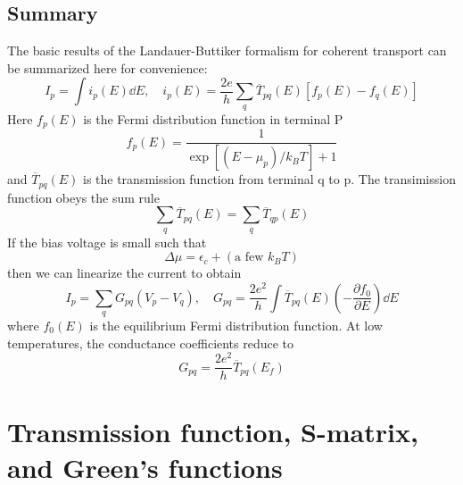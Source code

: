 \documentclass[11pt,a4paper]{book}
\theoremstyle{plain}
\theoremstyle{definition}
\theoremstyle{remark}
\begin{document}
\section{Summary}
The basic results of the Landauer-Buttiker formalism for coherent transport can be summarized here for convenience:
\begin{equation}
    I_p = \int i_p(E) \dd E, \quad i_p(E) = \frac{2 e}{h} \sum_q \overline{T}_{pq}(E) \left[ f_p(E) - f_q(E) \right]
\end{equation}
Here $f_p(E)$ is the Fermi distribution function in terminal P
\begin{equation}
    f_p(E) = \frac{1}{\exp \left[(E - \mu_p)/k_B T \right] + 1}
\end{equation}
and $\overline{T}_{pq}(E)$ is the transmission function from terminal q to p. The transimission function obeys the sum rule
\begin{equation}
    \sum_q \overline{T}_{pq}(E) = \sum_q \overline{T}_{qp}(E)
\end{equation}
If the bias voltage is small such that
\begin{equation}
    \Delta \mu = \epsilon_c + (\mbox{a few } k_B T)
\end{equation}
then we can linearize the current to obtain
\begin{equation}
    I_p = \sum_q G_{pq} (V_p - V_q), \quad G_{pq} = \frac{2 e^2}{h} \int \overline{T}_{pq}(E) \left( -\frac{\partial f_0}{\partial E} \right) \dd E
\end{equation}
where $f_0(E)$ is the equilibrium Fermi distribution function. At low temperatures, the conductance coefficients reduce to
\begin{equation}
    G_{pq} = \frac{2 e^2}{h} \overline{T}_{pq}(E_f)
\end{equation}

\chapter{Transmission function, S-matrix, and Green's functions}
\end{document}
